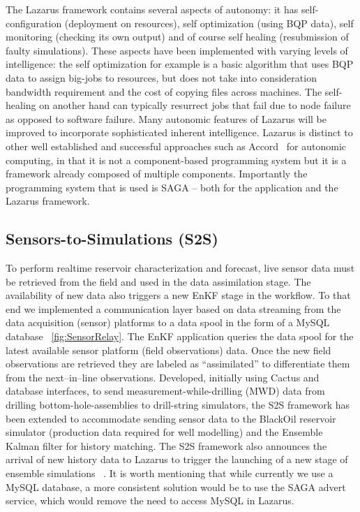 \documentclass{acm_proc_article-sp}
\begin{document}
The Lazarus framework contains several aspects of autonomy: it has
self-configuration (deployment on resources), self optimization (using
BQP data), self monitoring (checking its own output) and of course
self healing (resubmission of faulty simulations). These aspects have
been implemented with varying levels of intelligence: the self
optimization for example is a basic algorithm that uses BQP data to
assign big-jobs to resources, but does not take into consideration
bandwidth requirement and the cost of copying files across
machines. The self-healing on another hand can typically resurrect
jobs that fail due to node failure as opposed to software
failure. Many autonomic features of Lazarus will be improved to
incorporate sophisticated inherent intelligence.  Lazarus is distinct
to other well established and successful approaches such as
Accord~\cite{accord} for autonomic computing, in that it is not a
component-based programming system but it is a framework already
composed of multiple components. Importantly the programming system
that is used is SAGA -- both for the application and the Lazarus
framework.


\subsection{Sensors-to-Simulations (S2S)} 

To perform realtime reservoir characterization and forecast, live
sensor data must be retrieved from the field and used in the data
assimilation stage. The availability of new data also triggers a new
EnKF stage in the workflow. To that end we implemented a communication
layer based on data streaming from the data acquisition (sensor)
platforms to a data spool in the form of a MySQL database
~\ref{fig:SensorRelay}. The EnKF application queries the data spool
for the latest available sensor platform (field observations)
data. Once the new field observations are retrieved they are labeled
as ``assimilated'' to differentiate them from the next--in--line
observations.  Developed, initially using Cactus and database
interfaces, to send measurement-while-drilling (MWD) data from
drilling bottom-hole-assemblies to drill-string simulators, the S2S
framework has been extended to accommodate sending sensor data to the
BlackOil reservoir simulator (production data required for well
modelling) and the Ensemble Kalman filter for history matching. The
S2S framework also announces the arrival of new history data to
Lazarus to trigger the launching of a new stage of ensemble
simulations ~\cite{Duff1,Duff2}.  It is worth mentioning that while
currently we use a MySQL database, a more consistent solution would be
to use the SAGA advert service, which would remove the need to access
MySQL in Lazarus.
\end{document}
